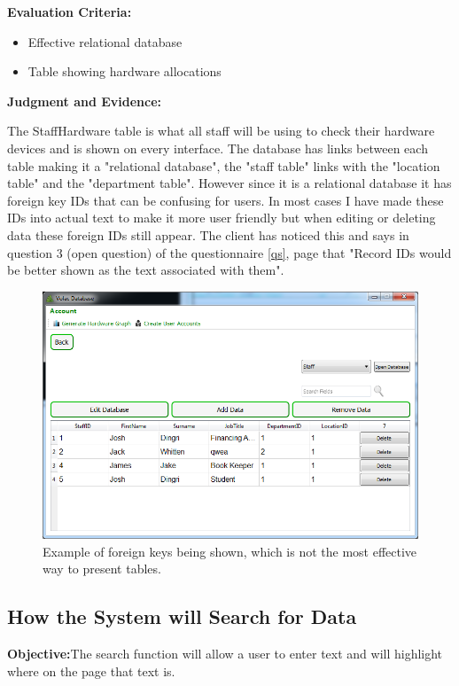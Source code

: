 \textbf{Evaluation Criteria:}
\begin{itemize}
\item{Effective relational database}
\item{Table showing hardware allocations}
\end{itemize}

\textbf{Judgment and Evidence:}

The StaffHardware table is what all staff will be using to check their hardware devices and is shown on every interface. The database has links between each table making it a "relational database", the "staff table" links with the "location table" and the "department table". However since it is a relational database it has foreign key IDs that can be confusing for users. In most cases I have made these IDs into actual text to make it more user friendly but when editing or deleting data these foreign IDs still appear. The client has noticed this and says in question 3  (open question) of the questionnaire \ref{qs}, page \pageref{qs} that "Record IDs would be better shown as the text associated with them".

\begin{figure}[H]
    \includegraphics[width=\textwidth]{./Testing/Images/RemoveDataButtons.png}
    \caption{Example of foreign keys being shown, which is not the most effective way to present tables.} 
\end{figure}

\subsection{How the System will Search for Data}

\textbf{Objective:}The search function will allow a user to enter text and will highlight where on the page that text is.

